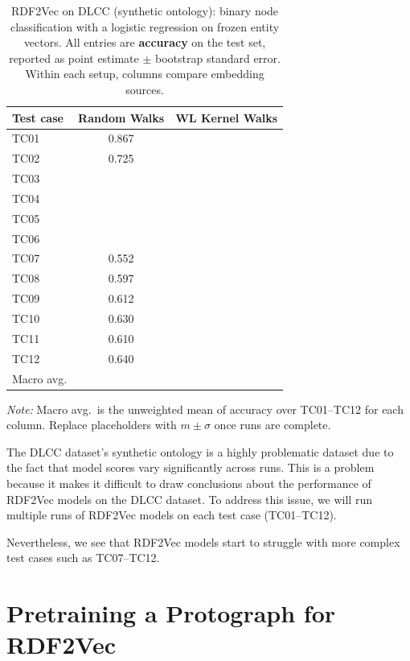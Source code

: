 \documentclass[a4paper,oneside,bibliography=totoc]{scrartcl}
\begin{document}
\begingroup
\newcommand{\D}{\textemdash{}}
\begin{table}[t]
  \centering
  \caption{RDF2Vec on DLCC (synthetic ontology): binary node classification with a logistic regression on frozen entity vectors. All entries are \textbf{accuracy} on the test set, reported as point estimate $\pm$ bootstrap standard error. Within each setup, columns compare embedding sources.}
  \label{tab:dlcc-rdf2vec}
  \footnotesize
  \setlength{\tabcolsep}{6pt}
  \begin{tabular}{@{}lcc@{}}
    \toprule
    Test case
      & Random Walks
      & WL Kernel Walks \\
    \midrule
    TC01 & 0.867 & \D \\
    TC02 & 0.725 & \D \\
    TC03 & \D & \D \\
    TC04 & \D & \D \\
    TC05 & \D & \D \\
    TC06 & \D & \D \\
    TC07 & 0.552 & \D \\
    TC08 & 0.597 & \D \\
    TC09 & 0.612 & \D \\
    TC10 & 0.630 & \D \\
    TC11 & 0.610 & \D \\
    TC12 & 0.640 & \D \\
    \midrule
    Macro avg.
      & \D & \D \\
    \bottomrule
  \end{tabular}
  \vspace{0.4em}
  \par\noindent\small\textit{Note:} Macro avg.\ is the unweighted mean of accuracy over TC01--TC12 for each column. Replace placeholders with $m \pm \sigma$ once runs are complete.
\end{table}

\endgroup

The DLCC dataset's synthetic ontology is a highly problematic dataset due to the fact that model scores vary significantly across runs.
This is a problem because it makes it difficult to draw conclusions about the performance of RDF2Vec models on the DLCC dataset.
To address this issue, we will run multiple runs of RDF2Vec models on each test case (TC01--TC12).

Nevertheless, we see that RDF2Vec models start to struggle with more complex test cases such as TC07--TC12. 

\section{Pretraining a Protograph for RDF2Vec}
\end{document}
